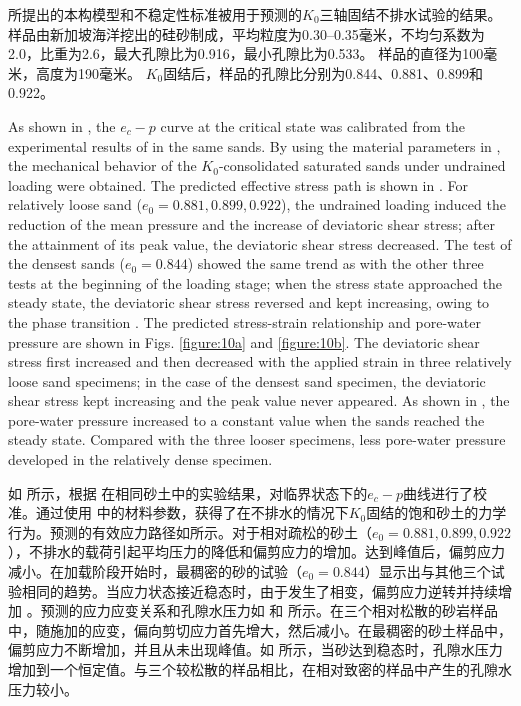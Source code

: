 \begin{ParaColumn}
    \switchcolumn

    所提出的本构模型和不稳定性标准被用于预测\citet{Chu2008}的$K_0$三轴固结不排水试验的结果。 样品由新加坡海洋挖出的硅砂制成，平均粒度为0.30–0.35毫米，不均匀系数为2.0，比重为2.6，最大孔隙比为0.916，最小孔隙比为0.533。 样品的直径为100毫米，高度为190毫米。 $K_0$固结后，样品的孔隙比分别为0.844、0.881、0.899和0.922。

    \switchcolumn*

    As shown in , the $e_c-p$ curve at the critical state was calibrated from the experimental results of \citet{Chu2003} in the same sands. By using the material parameters in , the mechanical behavior of the $K_0$-consolidated saturated sands under undrained loading were obtained. The predicted effective stress path is shown in . For relatively loose sand ($e_0 = 0.881,0.899,0.922$), the undrained loading induced the reduction of the mean pressure and the increase of deviatoric shear stress; after the attainment of its peak value, the deviatoric shear stress decreased. The test of the densest sands ($e_0 = 0.844$) showed the same trend as with the other three tests at the beginning of the loading stage; when the stress state approached the steady state, the deviatoric shear stress reversed and kept increasing, owing to the phase transition \citep{Ishihara1993}. The predicted stress-strain relationship and pore-water pressure are shown in Figs. \ref{figure:10a} and \ref{figure:10b}. The deviatoric shear stress first increased and then decreased with the applied strain in three relatively loose sand specimens; in the case of the densest sand specimen, the deviatoric shear stress kept increasing and the peak value never appeared. As shown in , the pore-water pressure increased to a constant value when the sands reached the steady state. Compared with the three looser specimens, less pore-water pressure developed in the relatively dense specimen.

    \switchcolumn

    如  所示，根据 \citet{Chu2003} 在相同砂土中的实验结果，对临界状态下的$e_c-p$曲线进行了校准。通过使用  中的材料参数，获得了在不排水的情况下$K_0$固结的饱和砂土的力学行为。预测的有效应力路径如所示。对于相对疏松的砂土（$e_0 = 0.881,0.899,0.922$），不排水的载荷引起平均压力的降低和偏剪应力的增加。达到峰值后，偏剪应力减小。在加载阶段开始时，最稠密的砂的试验（$e_0 = 0.844$）显示出与其他三个试验相同的趋势。当应力状态接近稳态时，由于发生了相变，偏剪应力逆转并持续增加 \citep{Ishihara1993}。预测的应力应变关系和孔隙水压力如  和  所示。在三个相对松散的砂岩样品中，随施加的应变，偏向剪切应力首先增大，然后减小。在最稠密的砂土样品中，偏剪应力不断增加，并且从未出现峰值。如  所示，当砂达到稳态时，孔隙水压力增加到一个恒定值。与三个较松散的样品相比，在相对致密的样品中产生的孔隙水压力较小。


\end{ParaColumn}
